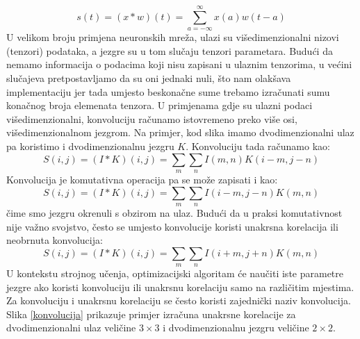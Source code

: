 \[
s(t) = (x \ast w)(t) = \sum\limits_{a = - \infty}^{\infty} x(a)w(t-a) 
\] 
U velikom broju primjena neuronskih mreža, ulazi su višedimenzionalni nizovi (tenzori) podataka, a jezgre su u tom slučaju tenzori parametara. Budući da nemamo informacija o podacima koji nisu zapisani u ulaznim tenzorima, u većini slučajeva pretpostavljamo da su oni jednaki nuli, što nam olakšava implementaciju jer tada umjesto beskonačne sume trebamo izračunati sumu konačnog broja elemenata tenzora. U primjenama gdje su ulazni podaci višedimenzionalni, konvoluciju računamo istovremeno preko više osi, višedimenzionalnom jezgrom. Na primjer, kod slika imamo dvodimenzionalni ulaz pa koristimo i dvodimenzionalnu jezgru $K$. Konvoluciju tada računamo kao:
\[
S(i, j) = (I \ast K)(i, j) = \sum\limits_{m} \sum\limits_{n} I(m, n)K(i - m, j - n)
\]
Konvolucija je komutativna operacija pa se može zapisati i kao:
\[
S(i, j) = (I \ast K)(i, j) = \sum\limits_{m} \sum\limits_{n} I(i - m, j - n)K(m, n)
\]
čime smo jezgru okrenuli s obzirom na ulaz. 
Budući da u praksi komutativnost nije važno svojstvo, često se umjesto konvolucije koristi unakrsna korelacija ili neobrnuta konvolucija:
\[
S(i, j) = (I \ast K)(i, j) = \sum\limits_{m} \sum\limits_{n} I(i + m, j + n)K(m, n)
\]
U kontekstu strojnog učenja, optimizacijski algoritam će naučiti iste parametre jezgre ako koristi konvoluciju ili unakrsnu korelaciju samo na različitim mjestima. Za konvoluciju i unakrsnu korelaciju se često koristi zajednički naziv konvolucija. Slika \ref{konvolucija} prikazuje primjer izračuna unakrsne korelacije za dvodimenzionalni ulaz veličine $3 \times 3$ i dvodimenzionalnu jezgru veličine $2 \times 2$.

